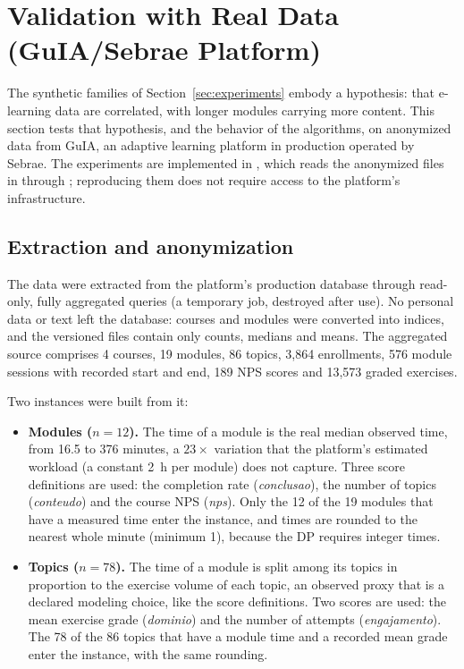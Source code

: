 \section{Validation with Real Data (GuIA/Sebrae Platform)}\label{sec:real}

The synthetic families of Section~\ref{sec:experiments} embody a hypothesis: that e-learning data are correlated, with longer modules carrying more content. This section tests that hypothesis, and the behavior of the algorithms, on anonymized data from GuIA, an adaptive learning platform in production operated by Sebrae. The experiments are implemented in , which reads the anonymized files in  through ; reproducing them does not require access to the platform's infrastructure.

\subsection{Extraction and anonymization}

The data were extracted from the platform's production database through read-only, fully aggregated queries (a temporary job, destroyed after use). No personal data or text left the database: courses and modules were converted into indices, and the versioned files contain only counts, medians and means. The aggregated source comprises 4 courses, 19 modules, 86 topics, 3,864 enrollments, 576 module sessions with recorded start and end, 189 NPS scores and 13,573 graded exercises.

Two instances were built from it:
\begin{itemize}[leftmargin=1.4em,itemsep=2pt]
\item \textbf{Modules ($n=12$).} The time of a module is the real median observed time, from 16.5 to 376 minutes, a $23\times$ variation that the platform's estimated workload (a constant 2~h per module) does not capture. Three score definitions are used: the completion rate (\emph{conclusao}), the number of topics (\emph{conteudo}) and the course NPS (\emph{nps}). Only the 12 of the 19 modules that have a measured time enter the instance, and times are rounded to the nearest whole minute (minimum 1), because the DP requires integer times.
\item \textbf{Topics ($n=78$).} The time of a module is split among its topics in proportion to the exercise volume of each topic, an observed proxy that is a declared modeling choice, like the score definitions. Two scores are used: the mean exercise grade (\emph{dominio}) and the number of attempts (\emph{engajamento}). The 78 of the 86 topics that have a module time and a recorded mean grade enter the instance, with the same rounding.
\end{itemize}

